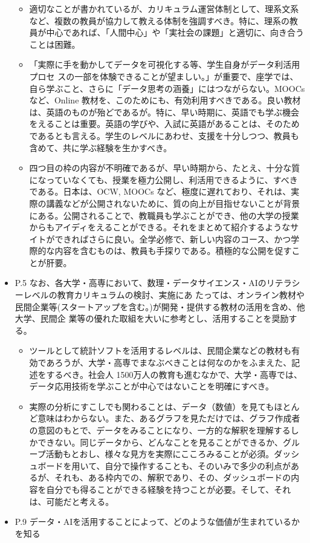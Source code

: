 \documentclass[
]{book}
\providecommand{\tightlist}{%
  \setlength{\itemsep}{0pt}\setlength{\parskip}{0pt}}
\theoremstyle{definition}
\theoremstyle{definition}
\theoremstyle{definition}
\theoremstyle{definition}
\theoremstyle{remark}
\begin{document}
\begin{itemize}
  \begin{itemize}
  \tightlist
  \item
    適切なことが書かれているが、カリキュラム運営体制として、理系文系など、複数の教員が協力して教える体制を強調すべき。特に、理系の教員が中心であれば、「人間中心」や「実社会の課題」と適切に、向き合うことは困難。
  \item
    「実際に手を動かしてデータを可視化する等、学生自身がデータ利活用プロセ スの一部を体験できることが望ましい。」が重要で、座学では、自ら学ぶこと、さらに「データ思考の涵養」にはつながらない。MOOCs など、Online 教材を、このためにも、有効利用すべきである。良い教材は、英語のものが殆どであるが。特に、早い時期に、英語でも学ぶ機会をえることは重要。英語の学びや、入試に英語があることは、そのためであるとも言える。学生のレベルにあわせ、支援を十分しつつ、教員も含めて、共に学ぶ経験を生かすべき。
  \item
    四つ目の枠の内容が不明確であるが、早い時期から、たとえ、十分な質になっていなくても、授業を極力公開し、利活用できるように、すべきである。日本は、OCW, MOOCs など、極度に遅れており、それは、実際の講義などが公開されないために、質の向上が目指せないことが背景にある。公開されることで、教職員も学ぶことができ、他の大学の授業からもアイディをえることができる。それをまとめて紹介するようなサイトができればさらに良い。全学必修で、新しい内容のコース、かつ学際的な内容を含むものは、教員も手探りである。積極的な公開を促すことが肝要。
  \end{itemize}
\item
  P.5 なお、各大学・高専において、数理・データサイエンス・AIのリテラシーレベルの教育カリキュラムの検討、実施にあ たっては、オンライン教材や民間企業等(スタートアップを含む。)が開発・提供する教材の活用を含め、他大学、民間企 業等の優れた取組を大いに参考とし、活用することを奨励する。

  \begin{itemize}
  \tightlist
  \item
    ツールとして統計ソフトを活用するレベルは、民間企業などの教材も有効であろうが、大学・高専でまなぶべきことは何なのかをふまえた、記述をするべき。社会人 1500万人の教育も進むなかで、大学・高専では、データ応用技術を学ぶことが中心ではないことを明確にすべき。
  \item
    実際の分析にすこしでも関わることは、データ（数値）を見てもほとんど意味はわからない。また、あるグラフを見ただけでは、グラフ作成者の意図のもとで、データをみることになり、一方的な解釈を理解するしかできない。同じデータから、どんなことを見ることができるか、グループ活動もとおし、様々な見方を実際にこころみることが必須。ダッシュボードを用いて、自分で操作することも、そのいみで多少の利点があるが、それも、ある枠内での、解釈であり、その、ダッシュボードの内容を自分でも得ることができる経験を持つことが必要。そして、それは、可能だと考える。
  \end{itemize}
\item
  P.9 データ・AIを活用することによって、どのような価値が生まれているかを知る


\end{itemize}
\end{document}
